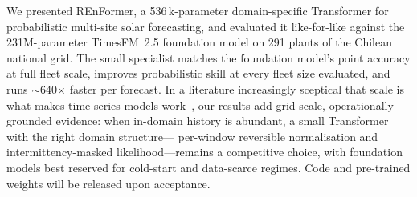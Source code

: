 \documentclass[10pt,twocolumn]{article}
\begin{document}
We presented REnFormer, a 536\,k-parameter domain-specific Transformer
for probabilistic multi-site solar forecasting, and evaluated it
like-for-like against the 231M-parameter TimesFM~2.5 foundation model
on 291 plants of the Chilean national grid. The small specialist matches
the foundation model's point accuracy at full fleet scale, improves
probabilistic skill at every fleet size evaluated, and runs
$\sim$640$\times$ faster per forecast. In a literature increasingly
sceptical that scale is what makes time-series models
work~\cite{tan2024useful,fan2025smetimes,birkel2025tinytsm}, our results
add grid-scale, operationally grounded evidence: when in-domain history
is abundant, a small Transformer with the right domain structure---
per-window reversible normalisation and intermittency-masked
likelihood---remains a competitive choice, with foundation models
best reserved for cold-start and data-scarce regimes. Code and
pre-trained weights will be released upon acceptance.

\balance


\end{document}
